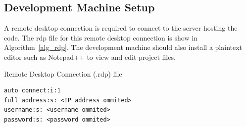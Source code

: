 \subsection{Development Machine Setup}
A remote desktop connection is required to connect to the server hosting the code. The rdp file for this remote desktop connection is show in Algorithm~\ref{alg_rdp}. The development machine should also install a plaintext editor such as Notepad++ to view and edit project files. 
\begin{algorithm} [tbh]                     
\caption{Remote Desktop Connection (.rdp) file}
\label{alg_rdp}    
\begin{lstlisting}
auto connect:i:1
full address:s: <IP address ommited>
username:s: <username ommited>
password:s: <password ommited>
\end{lstlisting}
\end{algorithm}


